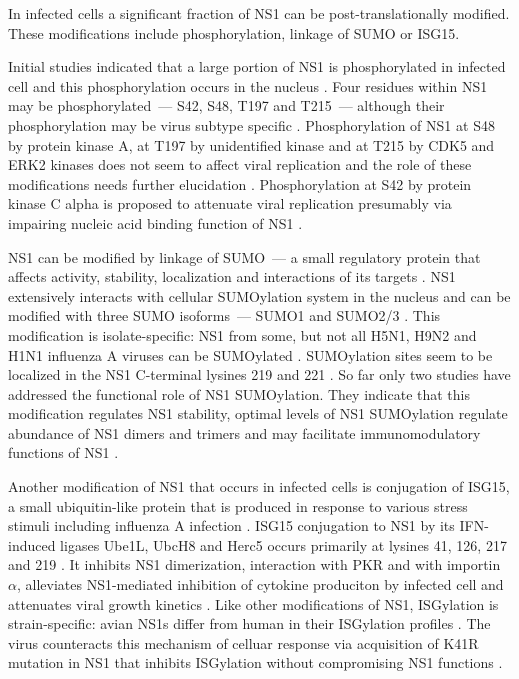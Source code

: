 		In infected cells a significant fraction of \gls{NS1} can be post-translationally modified. These modifications include phosphorylation, linkage of \gls{SUMO} or \gls{ISG15}.
		
		Initial studies indicated that a large portion of \gls{NS1} is phosphorylated in infected cell and this phosphorylation occurs in the nucleus \parencite{Privalsky1981}. Four residues within \gls{NS1} may be phosphorylated~--- S42, S48, T197 and T215~--- although their phosphorylation may be virus subtype specific \parencite{Petri1982}. Phosphorylation of \gls{NS1} at S48 by protein kinase A, at T197 by unidentified kinase and at T215 by CDK5 and ERK2 kinases does not seem to affect viral replication and the role of these modifications needs further elucidation \parencite{Hale2009, Hutchinson2012, Hsiang2012}. Phosphorylation at S42 by protein kinase C alpha is proposed to attenuate viral replication presumably via impairing nucleic acid binding function of \gls{NS1} \parencite{Hsiang2012}.
		
		\gls{NS1} can be modified by linkage of \gls{SUMO}~--- a small regulatory protein that affects activity, stability, localization and interactions of its targets \parencite{Johnson2004, Pal2010a}. \gls{NS1} extensively interacts with cellular \gls{SUMO}ylation system in the nucleus and can be modified with three \gls{SUMO} isoforms~--- \gls{SUMO}1 and \gls{SUMO}2/3 \parencite{Pal2011, Santos2013a}. This modification is isolate-specific: \gls{NS1} from some, but not all H5N1, H9N2 and H1N1 influenza A viruses can be \gls{SUMO}ylated \parencite{Xu2011}. \gls{SUMO}ylation sites seem to be localized in the NS1 C-terminal lysines 219 and 221 \parencite{Xu2011}. So far only two studies have addressed the functional role of \gls{NS1} \gls{SUMO}ylation. They indicate that this modification regulates \gls{NS1} stability, optimal levels of \gls{NS1} \gls{SUMO}ylation regulate abundance of \gls{NS1} dimers and trimers and may facilitate immunomodulatory functions of \gls{NS1} \parencite{Xu2011, Santos2013a}. 
		
		Another modification of \gls{NS1} that occurs in infected cells is conjugation of \gls{ISG15}, a small ubiquitin-like protein that is produced in response to various stress stimuli including influenza A infection \parencite{Pitha-Rowe2007, Sadler2008, Hsiang2009}. \gls{ISG15} conjugation to \gls{NS1} by its \gls{IFN}-induced ligases Ube1L, UbcH8 and Herc5 occurs primarily at lysines 41, 126, 217 and 219 \parencite{Zhao2010, Tang2010a}. It inhibits \gls{NS1} dimerization, interaction with \gls{PKR} and with importin $\alpha$, alleviates \gls{NS1}-mediated inhibition of cytokine produciton by infected cell and attenuates viral growth kinetics \parencite{Zhao2010, Tang2010a}. Like other modifications of \gls{NS1}, ISGylation is strain-specific: avian \gls{NS1}s differ from human in their ISGylation profiles \parencite{Tang2010a}. The virus counteracts this mechanism of celluar response via acquisition of K41R mutation in NS1 that inhibits ISGylation without compromising \gls{NS1} functions \parencite{Zhao2013}.
	
